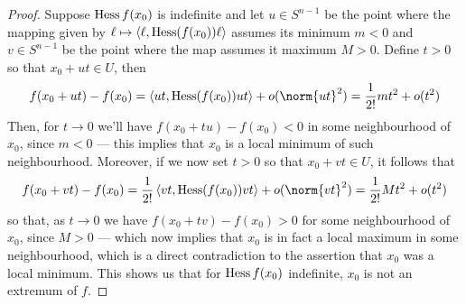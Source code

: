 \begin{proof}
  Suppose \(\operatorname{Hess} f(x_0)\) is indefinite and let \(u \in S^{n-1}\) be the point
  where the mapping given by \(\ell \mapsto \left\langle \ell, \operatorname{Hess}(f(x_0)) \ell \right\rangle\) assumes
  its minimum \(m < 0\) and \(v \in S^{n-1}\) be the point where the map assumes
  it maximum \(M > 0\). Define \(t > 0\) so that \(x_0 + ut \in U\), then
  \[
    f(x_0 + ut) - f(x_0) = \left\langle ut, \Hess(f(x_0)) ut \right\rangle + o(\norm{ut}^2)
    = \frac{1}{2!} mt^2 + o(t^2)
  \]
  Then, for \(t \to 0\) we'll have \(f(x_0 + t u) - f(x_0) < 0\) in some
  neighbourhood of \(x_0\), since \(m < 0\) --- this implies that \(x_0\) is a
  local minimum of such neighbourhood. Moreover, if we now set \(t > 0\)
  so that \(x_0 + vt \in U\), it follows that
  \[
    f(x_0 + vt) - f(x_{0})
    = \frac{1}{2!} \left\langle vt, \Hess(f(x_0)) vt \right\rangle + o(\norm{vt}^2)
    = \frac{1}{2!} M t^2 + o(t^2)
  \]
  so that, as \(t \to 0\) we have \(f(x_0 + t v) - f(x_0) > 0\) for some
  neighbourhood of \(x_0\), since \(M > 0\) --- which now implies that \(x_0\) is
  in fact a local maximum in some neighbourhood, which is a direct contradiction
  to the assertion that \(x_0\) was a local minimum. This shows us that for
  \(\operatorname{Hess} f(x_0)\) indefinite, \(x_0\) is not an extremum of \(f\).
\end{proof}


